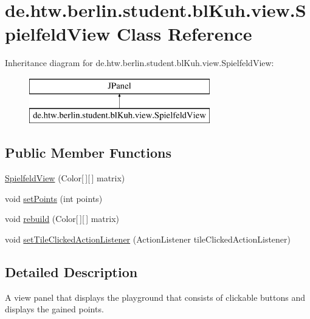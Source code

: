 \hypertarget{classde_1_1htw_1_1berlin_1_1student_1_1bl_kuh_1_1view_1_1_spielfeld_view}{\section{de.\-htw.\-berlin.\-student.\-bl\-Kuh.\-view.\-Spielfeld\-View Class Reference}
\label{classde_1_1htw_1_1berlin_1_1student_1_1bl_kuh_1_1view_1_1_spielfeld_view}
}
Inheritance diagram for de.\-htw.\-berlin.\-student.\-bl\-Kuh.\-view.\-Spielfeld\-View\-:\begin{figure}[H]
\begin{center}
\leavevmode
\includegraphics[height=2.000000cm]{classde_1_1htw_1_1berlin_1_1student_1_1bl_kuh_1_1view_1_1_spielfeld_view}
\end{center}
\end{figure}
\subsection*{Public Member Functions}
\begin{DoxyCompactItemize}
\item 
\hyperlink{classde_1_1htw_1_1berlin_1_1student_1_1bl_kuh_1_1view_1_1_spielfeld_view_aae3ce674647d9ab92b66316a0a82bbdd}{Spielfeld\-View} (Color\mbox{[}$\,$\mbox{]}\mbox{[}$\,$\mbox{]} matrix)
\item 
void \hyperlink{classde_1_1htw_1_1berlin_1_1student_1_1bl_kuh_1_1view_1_1_spielfeld_view_aed88286402a54ce980ddd84bf7ae98f1}{set\-Points} (int points)
\item 
void \hyperlink{classde_1_1htw_1_1berlin_1_1student_1_1bl_kuh_1_1view_1_1_spielfeld_view_ac129b0ada7f675559817c204ff7dec8d}{rebuild} (Color\mbox{[}$\,$\mbox{]}\mbox{[}$\,$\mbox{]} matrix)
\item 
void \hyperlink{classde_1_1htw_1_1berlin_1_1student_1_1bl_kuh_1_1view_1_1_spielfeld_view_a9ba63fc014f1a849064738d43d718a74}{set\-Tile\-Clicked\-Action\-Listener} (Action\-Listener tile\-Clicked\-Action\-Listener)
\end{DoxyCompactItemize}


\subsection{Detailed Description}
A view panel that displays the playground that consists of clickable buttons and displays the gained points.

